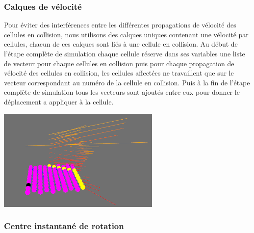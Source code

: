 \documentclass[a4paper,11pt]{article}
\begin{document}
\subsubsection{Calques de vélocité}

Pour éviter des interférences entre les différentes propagations de vélocité des cellules en collision, nous utilisons des calques uniques contenant une vélocité par cellules, chacun de ces calques sont liés à une cellule en collision.
Au début de l'étape complète de simulation chaque cellule réserve dans ses variables une liste de vecteur pour chaque cellules en collision puis pour chaque propagation de vélocité des cellules en collision, les cellules affectées ne travaillent que sur le vecteur correspondant au numéro de la cellule en collision.
Puis à la fin de l'étape complète de simulation tous les vecteurs sont ajoutés entre eux pour donner le déplacement a appliquer à la cellule. \\

\begin{center}
  \includegraphics[width=8cm]{Images/calque.png}
\end{center}

\subsubsection{Centre instantané de rotation}
\end{document}
